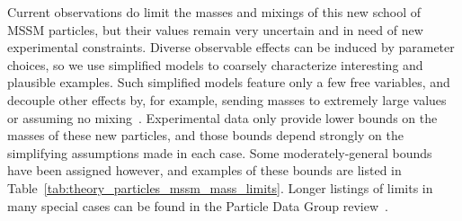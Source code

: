 Current observations do limit the masses and mixings of this new
school of MSSM particles, but their values remain very uncertain and in need
of new experimental constraints.
Diverse observable effects can be induced by parameter choices,
so we use simplified models to coarsely characterize interesting and plausible
examples.
Such simplified models feature only a few free variables, and decouple other
effects by, for example, sending masses to extremely large values or assuming
no mixing~\cite{
atlas2022searches,
alwall2009simplified,
alves20212simplified
}.
Experimental data only provide lower bounds on the masses of these new
particles, and those bounds depend strongly on the simplifying assumptions
made in each case. Some moderately-general bounds have been assigned however,
and examples of these bounds are listed in
Table~\ref{tab:theory_particles_mssm_mass_limits}.
Longer listings of limits in many special cases can be found in the
Particle Data Group review~\cite{pdg2022ynf}.


